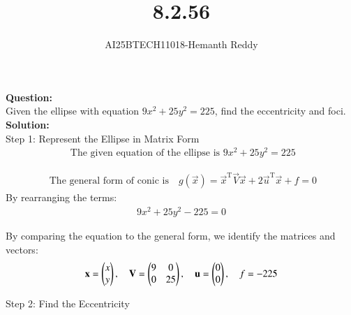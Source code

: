 \documentclass[journal]{IEEEtran}
\begin{document}

\vspace{3cm}

\title{8.2.56}
\author{AI25BTECH11018-Hemanth Reddy}
 \maketitle
{\let\newpage\relax\maketitle}

\renewcommand{\thefigure}{\theenumi}
\renewcommand{\thetable}{\theenumi}
\setlength{\intextsep}{10pt} %


\renewcommand{\thetable}{\theenumi}

\textbf{Question:}\\

Given the ellipse with equation $9x^{2} + 25y^{2} = 225$, find the eccentricity and foci.
\textbf{Solution:}\\






Step 1: Represent the Ellipse in Matrix Form\\
\begin{align}
   \text{ The given equation of the ellipse is }9x^2 + 25y^2 = 225
\end{align}

\begin{align}
     \text{  The general form of conic is} \quad g(\vec{x}) = \vec{x}^{\text{T}} \vec{V} \vec{x} + 2\vec{u}^{\text{T}} \vec{x} + f = 0
\end{align}
By rearranging the terms:
\begin{align}
    9x^2 + 25y^2 - 225 = 0
\end{align}

By comparing the equation to the general form, we identify the matrices and vectors:
\begin{align}
    \mathbf{x} = \begin{pmatrix} x \\ y \end{pmatrix}, \quad \mathbf{V} = \begin{pmatrix} 9 & 0 \\ 0 & 25 \end{pmatrix}, \quad \mathbf{u} = \begin{pmatrix} 0 \\ 0 \end{pmatrix}, \quad f = -225
\end{align}


Step 2: Find the Eccentricity\\
\end{document}
